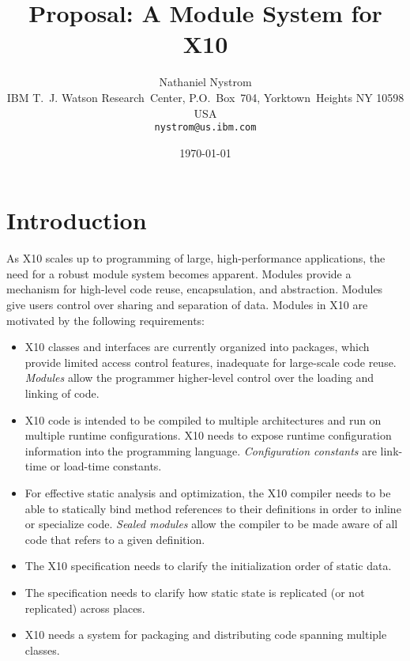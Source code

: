 \documentclass{article}
\newcommand\Xten{{\sf X10}\xspace}
\begin{document}
\title{Proposal: A Module System for X10}

\author{Nathaniel Nystrom \\
\small{IBM T.~J. Watson Research~Center,
P.O.~Box~704, Yorktown~Heights NY 10598 USA} \\
\small{\texttt{nystrom@us.ibm.com}}}

\date{\today}

\maketitle

\eat{
\begin{abstract}
We propose a module system for \Xten.
\end{abstract}
}

\section{Introduction}
\label{sec:intro}

As \Xten scales up to programming of large, high-performance applications,
the need for a robust module system becomes apparent.
Modules provide a mechanism for high-level code reuse,
encapsulation, and abstraction.
Modules give users control over sharing and separation of data.
Modules in \Xten are motivated by the following requirements:

\begin{itemize}
\item
\Xten classes and interfaces are currently organized into
packages, which provide limited access control features,
inadequate for large-scale code reuse.
\emph{Modules} allow the programmer higher-level control
over the loading and linking of code.

\item
\Xten code is intended to be compiled to multiple architectures
and run on multiple runtime configurations.
\Xten needs to expose runtime configuration information 
into the programming language.  \emph{Configuration constants} 
are link-time or load-time constants.

\item
For effective static analysis and optimization, the
\Xten compiler needs to be able to
statically bind method references to their definitions in order to
inline or specialize code.
\emph{Sealed modules} allow the compiler to be made aware of all code
that refers to a given definition.

\item
The \Xten specification needs to clarify the 
initialization order of static data.

\item
The specification needs to clarify how static state is
replicated (or not replicated) across places.

\item
\Xten needs a system for packaging and distributing code spanning
multiple classes.
\end{itemize}
\end{document}
